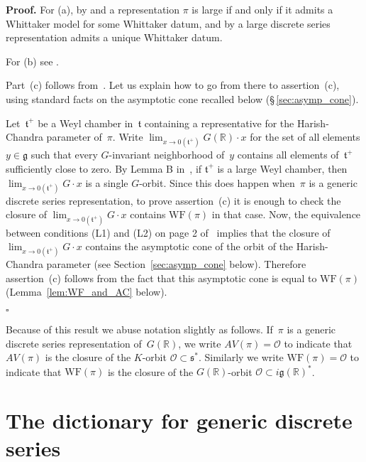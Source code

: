 \documentclass[10pt,leqno]{article}
\newcommand{\qed}{\hfill $\square$ \medskip}
\newenvironment{proof}[1][Proof]{\noindent\textbf{#1.} }{\qed}
\renewcommand{\O}{\mathcal O}
\newcommand{\R}{\mathbb R}
\newcommand{\g}{\mathfrak g}
\newcommand{\s}{\mathfrak s}
\newcommand{\WF}{\mathrm{WF}}
\begin{document}
\begin{proof} For (a), by \cite{vogan-gelfand-kirillov} and \cite{kostant_whittaker}
a representation $\pi$ is large if and only if it admits a Whittaker model for some Whittaker datum,
and by \cite[Lemma 14.14]{abv} a  large discrete series representation admits a unique Whittaker datum.

For (b) see \cite[Proposition A.9]{AV1}.

Part~(c) follows from~\cite[Lemma B]{rossmann_limit_orbits}. Let us explain how to go from there to  assertion~(c), using standard facts on the asymptotic cone recalled below (\S\,{}\ref{sec:asymp_cone}).

Let~$\mathfrak{t}^+$ be a Weyl chamber in~$\mathfrak{t}$ containing a representative for the Harish-Chandra parameter of~$\pi$. Write $\lim_{x \to 0(\mathfrak{t}^+)} G(\R)\cdot x$ for the set of all elements $y \in \g$ such that every $G$-invariant neighborhood of~$y$ contains all elements of~$\mathfrak{t}^+$ sufficiently close to zero. By Lemma B in~\cite{rossmann_limit_orbits}, if $\mathfrak{t}^+$ is a large Weyl chamber, then $\lim_{x \to 0(\mathfrak{t}^+)} G\cdot x$ is a single $G$-orbit.  Since this does happen when~$\pi$ is a generic discrete series representation, to prove assertion~(c)  it is enough to check the closure of $\lim_{x \to 0(\mathfrak{t}^+)} G\cdot x$ contains $\WF(\pi)$ in that case. Now, the equivalence between conditions  (L1) and (L2) on page 2 of~\cite{rossmann_limit_orbits} implies that the closure of $\lim_{x \to 0(\mathfrak{t}^+)} G\cdot x$ contains the asymptotic cone of the orbit of the Harish-Chandra parameter (see  Section~\ref{sec:asymp_cone} below). Therefore assertion~(c) follows from the fact that this asymptotic cone is equal to  $\WF(\pi)$  (Lemma~\ref{lem:WF_and_AC} below).


\end{proof}

Because of this result we abuse notation slightly as follows. If~$\pi$ is a generic discrete series representation of~$G(\R)$, we write $AV(\pi)=\O$ to indicate that $AV(\pi)$ is the closure of the $K$-orbit $\O\subset \s^*$.
Similarly we write $\WF(\pi)=\O$ to indicate that $\WF(\pi)$ is the closure of the $G(\R)$-orbit $\O\subset i\g(\R)^*$.



\section{The dictionary for generic discrete series}
\end{document}
